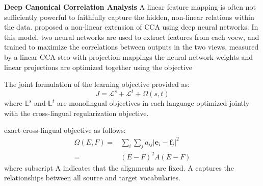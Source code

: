  
\textbf{Deep Canonical Correlation Analysis}
A linear feature mapping is often not sufficiently powerful to faithfully capture the hidden, non-linear relations within the data. proposed a non-linear extension of CCA using deep neural networks. In this model, two neural networks are used to extract features from each voew, and trained to maximize the correlations between outputs in the two views, measured by a linear CCA steo with projection mappings the neural network weights and linear projections are optimized together using the objective 
\[ \]


The joint formulation of the learning objective provided as:
\[ J = \mathcal{L}^s + \mathcal{L}^t + \Omega(s,t) \]
where ${\mathbb{L}^s}$ and ${\mathbb{L}^t}$ are monolingual objectives in each language optimized jointly with the cross-lingual regularization objective.

exact cross-lingual objective as follows:
\begin{align*}
	 \Omega(E, F) = & \sum_{i} \sum_{j} a_{ij} {\lvert \bm{e}_i - \bm{f}_j \rvert}^2 \\
	= & (E - F)^2 A (E - F)
\end{align*}
where subscript A indicates that the alignments are fixed. A captures the relationships between all source and target vocabularies.

